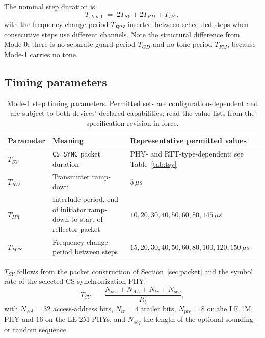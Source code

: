 \documentclass[11pt,a4paper]{article}
\newcommand{\us}{\,\ensuremath{\upmu}s}
\newcommand{\Tsy}{T_{SY}}
\newcommand{\Trd}{T_{RD}}
\newcommand{\Tip}{T_{IP1}}
\newcommand{\code}[1]{\texttt{\small #1}}
\providecommand{\upmu}{\mu}
\begin{document}
The nominal step duration is
\begin{equation}
T_{step,1} \;=\; 2\Tsy + 2\Trd + \Tip ,
\label{eq:stepdur}
\end{equation}
with the frequency-change period $T_{FCS}$ inserted between scheduled steps when consecutive steps
use different channels. Note the structural difference from Mode-0: there is no separate guard
period $T_{GD}$ and no tone period $T_{FM}$, because Mode-1 carries no tone.

\subsection{Timing parameters}

\begin{table}[h]
\caption{Mode-1 step timing parameters. Permitted sets are configuration-dependent and are subject
to both devices' declared capabilities; read the value lists from the specification revision in
force.}
\label{tab:timing}
\centering\small
\begin{tabular}{@{}L{20mm}L{58mm}L{50mm}@{}}
\toprule
Parameter & Meaning & Representative permitted values \\
\midrule
$\Tsy$   & \code{CS\_SYNC} packet duration & PHY- and RTT-type-dependent; see Table~\ref{tab:tsy} \\
$\Trd$   & Transmitter ramp-down & $5\us$ \\
$\Tip$   & Interlude period, end of initiator ramp-down to start of reflector packet & $10,20,30,40,50,60,80,145\us$ \\
$T_{FCS}$& Frequency-change period between steps & $15,20,30,40,50,60,80,100,120,150\us$ \\
\bottomrule
\end{tabular}
\end{table}

$\Tsy$ follows from the packet construction of Section~\ref{sec:packet} and the symbol rate of the
selected CS synchronization PHY:
\begin{equation}
\Tsy \;=\; \frac{N_{pre} + N_{AA} + N_{tr} + N_{seq}}{R_b},
\label{eq:tsy}
\end{equation}
with $N_{AA}=32$ access-address bits, $N_{tr}=4$ trailer bits, $N_{pre}=8$ on the LE 1M PHY and
$16$ on the LE 2M PHYs, and $N_{seq}$ the length of the optional sounding or random sequence.
\end{document}
